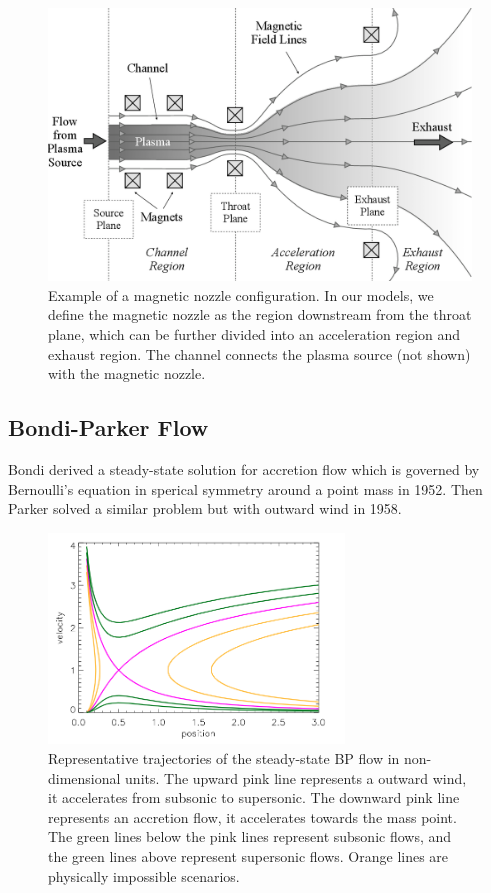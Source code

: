 \begin{figure}[htbp]
	\centering
	\includegraphics[width=0.7\linewidth]{img/introduction/magnetic-nozzle}
	\caption{Example of a magnetic nozzle configuration. In our models, we define the magnetic nozzle as the region downstream from the throat plane, which can be further divided into an acceleration region and exhaust region. The channel connects the plasma source (not shown) with the magnetic nozzle. \cite{little_performance_2015}}
	\label{fig:magnetic-nozzle}
\end{figure}

\subsection{Bondi-Parker Flow}
Bondi derived a steady-state solution for accretion flow which is governed by Bernoulli's equation in sperical symmetry around a point mass in 1952. Then Parker solved a similar problem but with outward wind in 1958. \cite{aikawa_stability_1979, bondi_spherically_1952,keto_stability_2020}

\begin{figure}[htbp]
    \centering
    \includegraphics[width=0.7\textwidth]{img/introduction/steady-state-BP-flow}
    \caption{Representative trajectories of the steady-state BP flow in non-dimensional units. \cite{keto_stability_2020} The upward pink line represents a outward wind, it accelerates from subsonic to supersonic. The downward pink line represents an accretion flow, it accelerates towards the mass point. The green lines below the pink lines represent subsonic flows, and the green lines above represent supersonic flows. Orange lines are physically impossible scenarios.}
    \label{fig:BP-flow-velocity}
\end{figure}

